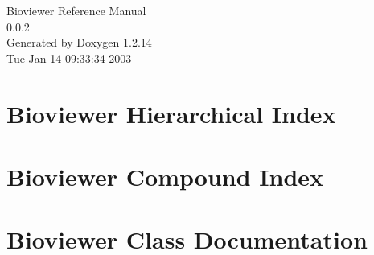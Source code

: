 \documentclass[a4paper]{book}
\begin{document}
\begin{titlepage}
\vspace*{7cm}
\begin{center}
{\Large Bioviewer Reference Manual\\[1ex]\large 0.0.2}\\
\vspace*{1cm}
{\large Generated by Doxygen 1.2.14}\\
\vspace*{0.5cm}
{\small Tue Jan 14 09:33:34 2003}\\
\end{center}
\end{titlepage}
\clearemptydoublepage
{}
\tableofcontents
\clearemptydoublepage
{}
\chapter{Bioviewer Hierarchical Index}

\chapter{Bioviewer Compound Index}

\chapter{Bioviewer Class Documentation}










\printindex
\end{document}
